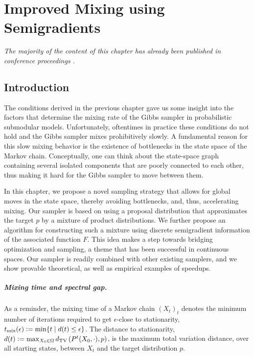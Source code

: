 \chapter{Improved Mixing using Semigradients} \label{ch:m3}

\emph{The majority of the content of this chapter has already been published in conference proceedings \citep{gotovos18}.}

\section{Introduction}
The conditions derived in the previous chapter gave us some insight into the factors that determine the mixing rate of the Gibbs sampler in probabilistic submodular models.
Unfortunately, oftentimes in practice these conditions do not hold and the Gibbs sampler mixes prohibitively slowly.
A fundamental reason for this slow mixing behavior is the existence of bottlenecks in the state space of the Markov chain.
Conceptually, one can think about the state-space graph containing several isolated components that are poorly connected to each other, thus making it hard for the Gibbs sampler to move between them.

In this chapter, we propose a novel sampling strategy that allows for global moves in the state space, thereby avoiding bottlenecks, and, thus, accelerating mixing.
Our sampler is based on using a proposal distribution that approximates the target $p$ by a mixture of product distributions.
We further propose an algorithm for constructing such a mixture using discrete semigradient information of the associated function $F$.
This idea makes a step towards bridging optimization and sampling, a theme that has been successful in continuous spaces.
Our sampler is readily combined with other existing samplers, and we show provable theoretical, as well as empirical examples of speedups.

\paragraph{Mixing time and spectral gap.}
As a reminder, the mixing time of a Markov chain $(X_t)_t$ denotes the minimum number of iterations required to get $\epsilon$-close to stationarity, $t_{\mathrm{mix}}(\epsilon) \vcentcolon= \min \{ t \mid d(t) \leq \epsilon \}$.
The distance to stationarity, $d(t) \vcentcolon= \max_{X_0 \in \Omega} d_{\textrm{TV}}\left( P^t(X_0, \cdot), p \right)$, is the maximum total variation distance, over all starting states, between $X_t$ and the target distribution $p$.

